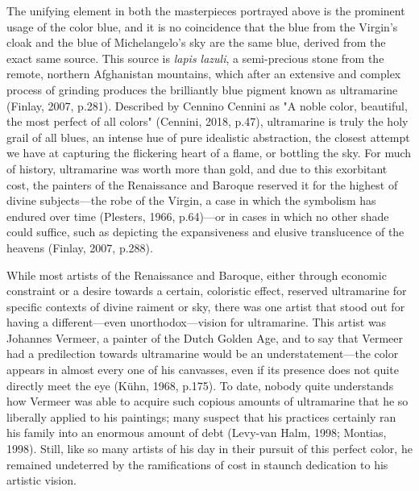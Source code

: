 The unifying element in both the masterpieces portrayed above is the
prominent usage of the color blue, and it is no coincidence that the
blue from the Virgin's cloak and the blue of Michelangelo's sky are the
same blue, derived from the exact same source. This source is
\emph{lapis lazuli}, a semi-precious stone from the remote, northern
Afghanistan mountains, which after an extensive and complex process of
grinding produces the brilliantly blue pigment known as ultramarine
(Finlay, 2007, p.281). Described by Cennino Cennini as "A noble color,
beautiful, the most perfect of all colors" (Cennini, 2018, p.47),
ultramarine is truly the holy grail of all blues, an intense hue of pure
idealistic abstraction, the closest attempt we have at capturing the
flickering heart of a flame, or bottling the sky. For much of history,
ultramarine was worth more than gold, and due to this exorbitant cost,
the painters of the Renaissance and Baroque reserved it for the highest
of divine subjects---the robe of the Virgin, a case in which the
symbolism has endured over time (Plesters, 1966, p.64)---or in cases
in which no other shade could suffice, such as depicting the
expansiveness and elusive translucence of the heavens (Finlay, 2007,
p.288).

While most artists of the Renaissance and Baroque, either through
economic constraint or a desire towards a certain, coloristic effect,
reserved ultramarine for specific contexts of divine raiment or sky,
there was one artist that stood out for having a different---even
unorthodox---vision for ultramarine. This artist was Johannes
Vermeer, a painter of the Dutch Golden Age, and to say that Vermeer had
a predilection towards ultramarine would be an understatement---the
color appears in almost every one of his canvasses, even if its presence
does not quite directly meet the eye (Kühn, 1968, p.175). To date,
nobody quite understands how Vermeer was able to acquire such copious
amounts of ultramarine that he so liberally applied to his paintings;
many suspect that his practices certainly ran his family into an
enormous amount of debt (Levy-van Halm, 1998; Montias, 1998). Still,
like so many artists of his day in their pursuit of this perfect color,
he remained undeterred by the ramifications of cost in staunch
dedication to his artistic vision.

